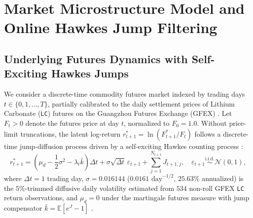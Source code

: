 \documentclass[11pt,a4paper]{article}
\begin{document}
\section{Market Microstructure Model and Online Hawkes Jump Filtering}
\label{sec:market_model}

\subsection{Underlying Futures Dynamics with Self-Exciting Hawkes Jumps}
We consider a discrete-time commodity futures market indexed by trading days $t \in \{0, 1, \dots, T\}$, partially calibrated to the daily settlement prices of Lithium Carbonate (\texttt{LC}) futures on the Guangzhou Futures Exchange (GFEX) \citep{Kong2024,Wang2025}. Let $F_t > 0$ denote the futures price at day $t$, normalized to $F_0 = 1.0$. Without price-limit truncations, the latent log-return $r_{t+1}^* = \ln(F_{t+1}^* / F_t)$ follows a discrete-time jump-diffusion process driven by a self-exciting Hawkes counting process \citep{Hawkes1971,AitSahalia2015,Bacry2015}:
\begin{equation}
  r_{t+1}^* = \left(\mu_d - \frac{1}{2}\sigma^2 - \lambda_t \bar{k}\right)\Delta t + \sigma \sqrt{\Delta t}\,\varepsilon_{t+1} + \sum_{j=1}^{N_{t+1}} J_{t+1,j}, \quad \varepsilon_{t+1} \stackrel{\text{i.i.d.}}{\sim} \mathcal{N}(0, 1),
  \label{eq:unconstrained_return}
\end{equation}
where $\Delta t = 1$ trading day, $\sigma = 0.016144$ ($0.0161\text{ day}^{-1/2}$, $25.63\%$ annualized) is the $5\%$-trimmed diffusive daily volatility estimated from $534$ non-roll GFEX \texttt{LC} return observations, and $\mu_d = 0$ under the martingale futures measure with jump compensator $\bar{k} = \mathbb{E}[e^{J} - 1]$ \citep{Black1976,Merton1976}.
\end{document}
